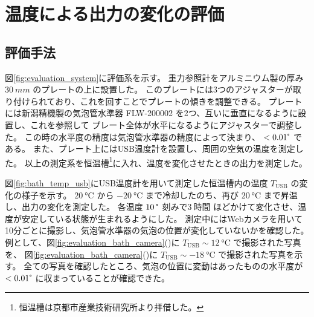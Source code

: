 \documentclass[../../main.tex]{subfiles}
\begin{document}
\section{温度による出力の変化の評価}
\subsection{評価手法}
図\ref{fig:evaluation_system}に評価系を示す。
重力参照計をアルミニウム製の厚み $\SI{30}{mm}$ のプレートの上に設置した。
このプレートには3つのアジャスターが取り付けられており、これを回すことでプレートの傾きを調整できる。
プレートには新潟精機製の気泡管水準器 FLW-200002 を2つ、互いに垂直になるように設置し、これを参照して
プレート全体が水平になるようにアジャスターで調整した。
この時の水平度の精度は気泡管水準器の精度によって決まり、 $< 0.01\tcdegree$ である。
また、プレート上にはUSB温度計を設置し、周囲の空気の温度を測定した。
以上の測定系を恒温槽\footnote{恒温槽は京都市産業技術研究所より拝借した。}に入れ、温度を変化させたときの出力を測定した。

図\ref{fig:bath_temp_usb}にUSB温度計を用いて測定した恒温槽内の温度 $T_{\mathrm{USB}}$ の変化の様子を示す。
$\SI{20}{\degreeCelsius}$ から $\SI{-20}{\degreeCelsius}$ まで冷却したのち、再び $\SI{20}{\degreeCelsius}$ まで昇温し、出力の変化を測定した。
各温度 $\SI{10}{\tcdegree}$ 刻みで$\SI{3}{時間}$ ほどかけて変化させ、温度が安定している状態が生まれるようにした。
測定中にはWebカメラを用いて10分ごとに撮影し、気泡管水準器の気泡の位置が変化していないかを確認した。
例として、図\ref{fig:evaluation_bath_camera}()に
$T_{\mathrm{USB}} \sim \SI{12}{\degreeCelsius}$ で撮影された写真を、
図\ref{fig:evaluation_bath_camera}()に
$T_{\mathrm{USB}} \sim \SI{-18}{\degreeCelsius}$ で撮影された写真を示す。
全ての写真を確認したところ、気泡の位置に変動はあったものの水平度が $< 0.01\tcdegree$ に収まっていることが確認できた。
\end{document}

